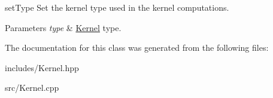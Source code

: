 set\+Type Set the kernel type used in the kernel computations. 


\begin{DoxyParams}{Parameters}
{\em type} & \hyperlink{class_kernel}{Kernel} type. \\
\hline
\end{DoxyParams}


The documentation for this class was generated from the following files\+:\begin{DoxyCompactItemize}
\item 
includes/Kernel.\+hpp\item 
src/Kernel.\+cpp\end{DoxyCompactItemize}
